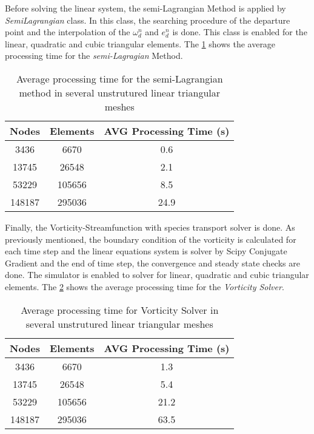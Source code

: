 \medskip
Before solving the linear system, the semi-Lagrangian Method is applied
by \textit{SemiLagrangian} class. In this class, the searching procedure
of the departure point and 
the interpolation of the $\omega_{d}^{n}$ and $e_{d}^{n}$ is done.
This class is enabled for the linear, quadratic and cubic triangular
elements.
The \ref{tempo semi lagrangian} 
shows the average processing time for the \textit{semi-Lagragian} Method.

\vspace{0.5cm}
\begin{table}[H]
\caption{Average processing time for the semi-Lagrangian method in several unstrutured linear triangular meshes}
\centering
\begin{tabular}{ccc}
\toprule
\textbf{Nodes} & \textbf{Elements} & \textbf{AVG Processing Time} (s) \\
\midrule
3436 & 6670 & 0.6 \\
13745 & 26548 & 2.1 \\
53229 & 105656 & 8.5 \\
148187 & 295036 & 24.9 \\



\bottomrule
\end{tabular}
\label{tempo semi lagrangian}
\end{table}




\medskip
Finally, the Vorticity-Streamfunction with species transport solver 
is done.  
As previously mentioned, the boundary condition of the vorticity
is calculated for each time step and 
the linear equations system is solver by Scipy Conjugate Gradient
and the end of time step, 
the convergence and steady state checks are done.
The simulator is enabled to solver for linear, quadratic and cubic
triangular elements. The \ref{tempo vorticity solver} 
shows the average processing time for the \textit{Vorticity Solver}.

\vspace{0.5cm}
\begin{table}[H]
\caption{Average processing time for Vorticity Solver in several unstrutured linear triangular meshes}
\centering
\begin{tabular}{ccc}
\toprule
\textbf{Nodes} & \textbf{Elements} & \textbf{AVG Processing Time} (s) \\
\midrule
3436 & 6670 & 1.3 \\
13745 & 26548 & 5.4 \\
53229 & 105656 & 21.2 \\
148187 & 295036 & 63.5 \\



\bottomrule
\end{tabular}
\label{tempo vorticity solver}
\end{table}



